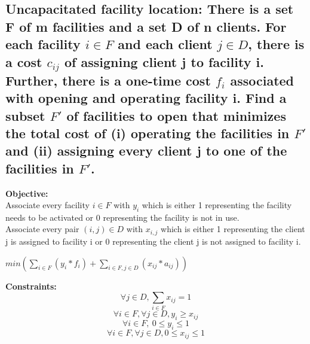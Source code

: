 \documentclass{article}
\begin{document}
\subsection{Uncapacitated facility location:  There is a set F of m facilities and a set D of n clients. For each facility $i \in F$ and each client $j \in D$, there is a cost $c_{ij}$ of assigning client j to facility i. Further, there is a one-time cost $f_i$ associated with opening and operating facility i. Find a subset $F'$ of facilities to open that minimizes the total cost of (i) operating the facilities in $F'$ and (ii) assigning every client j to one of the facilities in $F'$.}
\textbf{Objective:}\\
Associate every facility $i \in F$ with $y_i$ which is either 1 representing the facility needs to be activated or 0 representing the facility is not in use.\\
Associate every pair $(i,j)\in D $ with $x_{i,j}$ which is either 1 representing the client j is assigned to facility i or 0 representing the client j is not assigned to facility i.\\
\centerline{$min(\sum_{i \in F}(y_i*f_i) + \sum_{i \in F,j \in D}(x_{ij}*a_{ij}))$}
\textbf{Constraints:}\\
$$\forall j \in D, \sum_{i \in F}x_{ij} = 1$$
$$\forall i \in F,\forall j\in D, y_i \ge x_{ij}$$
$$\forall i \in F,\ 0 \le y_i \le 1$$
$$\forall i \in F,\forall j \in D, 0 \le x_{ij} \le 1$$
\end{document}
